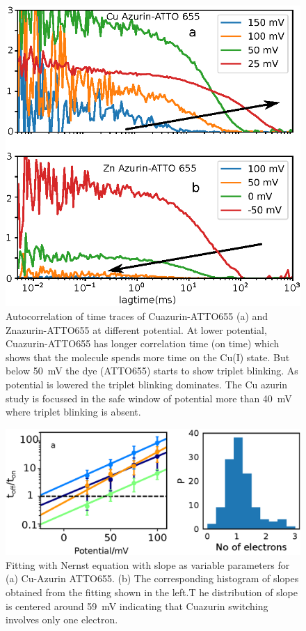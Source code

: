 \documentclass[11pt,a4paper,onecolumn]{article}
\begin{document}
\begin{figure}
  \centering
  \includegraphics[]{fcs_comparision.eps}
  \makeatletter
  \renewcommand{\fnum@figure}{\figurename~S\thefigure}
  \makeatother
  \caption{Autocorrelation of time traces of Cuazurin-ATTO655 (a) and Znazurin-ATTO655 at different potential. 
  At lower potential, Cuazurin-ATTO655 has longer correlation time (on time) which shows that the molecule spends more time on the Cu(I) state.
  But below \SI{50}{\mV} the dye (ATTO655) starts to show triplet blinking.
  As potential is lowered the triplet blinking dominates.
  The Cu azurin study is focussed in the safe window of potential more than \SI{40}{\mV} where triplet blinking is absent.}
  \label{SIfig:fcscomparision}
\end{figure}
\begin{figure}
  \centering
  \includegraphics[width=\textwidth,keepaspectratio]{SI_potential_slope.eps}
	\makeatletter
	\renewcommand{\fnum@figure}{\figurename~S\thefigure}
	\makeatother
  \caption{Fitting with Nernst equation with slope as variable parameters for  (a) Cu-Azurin ATTO655. 
  (b) The corresponding histogram of slopes obtained from the fitting shown in the left.T
  he distribution of slope is centered around \SI{59}{\mV} indicating that Cuazurin switching  involves only one electron.}
  \label{SIfig:potential_slope}
\end{figure}
\end{document}
